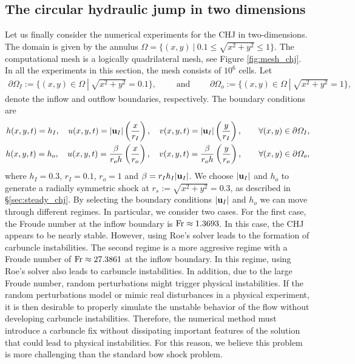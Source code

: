 \documentclass[preprint, 11pt]{article}
\newcommand{\bfu}{{\bf u}}
\newcommand{\Fr}{{\rm Fr}}
\begin{document}
\subsection{The circular hydraulic jump in two dimensions}\label{sec:2D_chj}
Let us finally consider the numerical experiments for the CHJ in two-dimensions.
The domain is given by the annulus $\Omega=\{(x,y)~|~ 0.1\leq\sqrt{x^2+y^2}\leq 1\}$.
The computational mesh is a logically quadrilateral mesh, see Figure \ref{fig:mesh_chj}.
In all the experiments in this section, the mesh consists of $10^6$ cells. 
Let
\begin{align*}
  \partial\Omega_I:=\{(x,y)\in\Omega ~|~ \sqrt{x^2+y^2}=0.1\}, \qquad \mbox{ and } \qquad
  \partial\Omega_o:=\{(x,y)\in\Omega ~|~ \sqrt{x^2+y^2}=1\},
\end{align*}
denote the inflow and outflow boundaries, respectively. 
The boundary conditions are 
\begin{subequations}\label{bcs_chj}
  \begin{align}
  h(x,y,t)=h_I, \quad
  u(x,y,t)=|\bfu_I| \left(\frac{x}{r_I}\right), \quad
  v(x,y,t)=|\bfu_I| \left(\frac{y}{r_I}\right), \qquad \forall (x,y)\in\partial\Omega_I, \\
  h(x,y,t)=h_o, \quad 
  u(x,y,t)= \frac{\beta }{r_o h}\left(\frac{x}{r_o}\right), \quad
  v(x,y,t)= \frac{\beta }{r_o h}\left(\frac{y}{r_o}\right), \qquad \forall (x,y)\in\partial\Omega_o, \label{bcs_chj_outflow}
  \end{align}
\end{subequations}
where $h_I=0.3$, $r_I=0.1$, $r_o=1$ and $\beta=r_Ih_I|\bfu_I|$.
We choose $|\bfu_I|$ and $h_o$ to generate a radially symmetric shock at $r_s:=\sqrt{x^2+y^2}=0.3$, as described in \S \ref{sec:steady_chj}.
By selecting the boundary conditions $|\bfu_I|$ and $h_o$ we can move through different regimes.
In particular, we consider two cases.
For the first case, the Froude number at the inflow boundary is $\Fr\approx 1.3693$.
In this case, the CHJ appears to be nearly stable.
However, using Roe's solver leads to the formation of carbuncle instabilities.
%
The second regime is a more aggresive regime with a Froude number of $\Fr\approx 27.3861$ at the inflow boundary. 
In this regime, using Roe's solver also leads to carbuncle instabilities. In addition, 
due to the large Froude number, random perturbations might trigger physical instabilities. 
If the random perturbations model or mimic real disturbances in a physical experiment, it is then
desirable to properly simulate the unstable behavior of the flow without developing carbuncle instabilities. 
Therefore, the numerical method must introduce a carbuncle fix without dissipating important features of the
solution that could lead to physical instabilities. 
For this reason, we believe this problem is more challenging than the standard bow shock problem.
\end{document}
